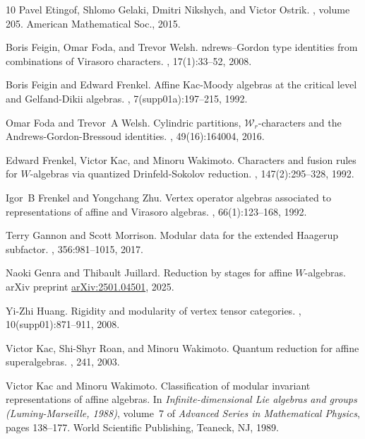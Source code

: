 \documentclass[12pt]{amsart}
\theoremstyle{plain}
\theoremstyle{definition}
\numberwithin{equation}{section}
\begin{document}
\begin{thebibliography}{10}
Pavel Etingof, Shlomo Gelaki, Dmitri Nikshych, and Victor Ostrik.
, volume 205.
\newblock American Mathematical Soc., 2015.

Boris Feigin, Omar Foda, and Trevor Welsh.
ndrews--{G}ordon type identities from combinations of {V}irasoro
  characters.
, 17(1):33--52, 2008.

Boris Feigin and Edward Frenkel.
\newblock Affine {K}ac-{M}oody algebras at the critical level and
  {G}elfand-{D}ikii algebras.
, 7(supp01a):197--215,
  1992.

Omar Foda and Trevor~A Welsh.
\newblock Cylindric partitions, {$\mathcal{W}_r$}-characters and the
  {A}ndrews-{G}ordon-{B}ressoud identities.
,
  49(16):164004, 2016.

Edward Frenkel, Victor Kac, and Minoru Wakimoto.
\newblock Characters and fusion rules for {$W$}-algebras via quantized
  {D}rinfeld-{S}okolov reduction.
, 147(2):295--328, 1992.

Igor~B Frenkel and Yongchang Zhu.
\newblock Vertex operator algebras associated to representations of affine and
  {V}irasoro algebras.
, 66(1):123--168, 1992.

Terry Gannon and Scott Morrison.
\newblock Modular data for the extended {H}aagerup subfactor.
, 356:981--1015, 2017.

Naoki Genra and Thibault Juillard.
\newblock Reduction by stages for affine {$W$}-algebras.
\newblock arXiv preprint \url{arXiv:2501.04501}, 2025.

Yi-Zhi Huang.
\newblock Rigidity and modularity of vertex tensor categories.
,
  10(supp01):871--911, 2008.

Victor Kac, Shi-Shyr Roan, and Minoru Wakimoto.
\newblock Quantum reduction for affine superalgebras.
, 241, 2003.

Victor Kac and Minoru Wakimoto.
\newblock Classification of modular invariant representations of affine
  algebras.
\newblock In {\em Infinite-dimensional Lie algebras and groups
  (Luminy-Marseille, 1988)}, volume~7 of {\em Advanced Series in Mathematical
  Physics}, pages 138--177. World Scientific Publishing, Teaneck, NJ, 1989.


\end{thebibliography}
\end{document}
